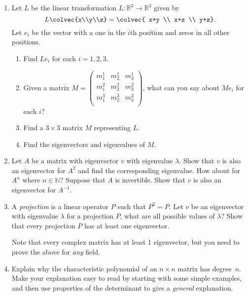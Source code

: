 \begin{enumerate}
\item Let $L$ be the linear transformation $L \colon \mathbb{R}^3\rightarrow \mathbb{R}^3$ given by 
\[L\colvec{x\\y\\z}=\colvec{ x+y \\  x+z \\ y+z}.\]  
Let $e_i$ be the vector with a one in the $i$th position and zeros in all other positions.
\begin{enumerate}
\item Find $Le_i$ for each $i=1,2,3$.
\item Given a matrix $M=\begin{pmatrix}
m^1_1 & m^1_2 & m^1_3\\
m^2_1 & m^2_2 & m^2_3\\
m^3_1 & m^3_2 & m^3_3\\
\end{pmatrix}$, what can you say about $Me_i$ for each $i$?
\item Find a $3\times 3$ matrix $M$ representing $L$.  
\item Find the eigenvectors and eigenvalues of \(M.\)

\end{enumerate}


\item Let $A$ be a matrix with eigenvector $v$ with eigenvalue $\lambda$. Show that $v$ is also an eigenvector for $A^2$ and find the corresponding eigenvalue. How about for $A^n$ where $n \in \mathbb{N}$? Suppose that $A$ is invertible. Show that $v$ is also an eigenvector for $A^{-1}$.

\item A \emph{projection} is a linear operator $P$ such that $P^2 = P$. Let $v$ be an eigenvector with eigenvalue $\lambda$ for a projection $P$, what are all possible values of $\lambda$? Show that every projection $P$ has at least one eigenvector.

Note that every complex matrix has at least 1 eigenvector, but you need to prove the above for \emph{any} field.


\item Explain why the characteristic polynomial of an $n\times n$ matrix has degree~$n$.  Make your explanation easy to read by starting with some simple examples, and then use properties of the determinant to give a \emph{general} explanation.


\end{enumerate}
